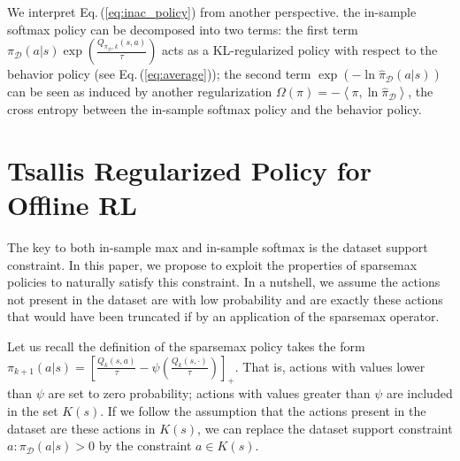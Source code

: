 \documentclass{article}
\newcommand{\AdaBracket}[1]{\left(#1\right)}
\newcommand{\AdaRectBracket}[1]{\left[#1\right]}
\newcommand{\AdaAngleProduct}[2]{\left\langle#1, #2\right\rangle}
\newcommand{\eq}[1]{Eq.\,(#1)}
\newcommand{\datasetPolicy}{\pi_{\mathcal{D}}}
\begin{document}
We interpret \eq{\ref{eq:inac_policy}} from another perspective.
the in-sample softmax policy can be decomposed into two terms:
the first term $\datasetPolicy(a|s) \exp\AdaBracket{\frac{Q_{\datasetPolicy, k}(s,a)}{\tau} }$ acts as a KL-regularized policy with respect to the behavior policy (see \eq{\ref{eq:average}}); 
the second term $\exp\AdaBracket{-\ln\hat{\pi}_{\mathcal{D}}(a|s)}$ can be seen as induced by another regularization $\Omega(\pi) = -\AdaAngleProduct{\pi}{\ln{\hat{\pi}_{\mathcal{D}}}}$, the cross entropy between the in-sample softmax policy and the behavior policy.


\section{Tsallis Regularized Policy for Offline RL}

The key to both in-sample max \cite{Fujimoto2019-InSampleMax} and in-sample softmax \cite{Xiao2023-InSampleSoftmax} is the dataset support constraint.
In this paper, we propose to exploit the properties of sparsemax policies to naturally satisfy this constraint.
In a nutshell, we assume the actions not present in the dataset are with low probability and are exactly these actions that would have been truncated if by an application of the sparsemax operator.

Let us recall the definition of the sparsemax policy takes the form $\pi_{k+1}(a|s) = \AdaRectBracket{\frac{Q_k(s,a)}{\tau} - \psi\AdaBracket{\frac{Q_k(s, \cdot)}{\tau}}}_{+}$. 
That is, actions with values lower than $\psi$ are set to zero probability;
actions with values greater than $\psi$ are included in the set $K(s)$.
If we follow the assumption that the actions present in the dataset are these actions in $K(s)$, we can replace the dataset support constraint $a:\datasetPolicy(a|s) > 0$ by the constraint $a\in K(s)$.
\end{document}
